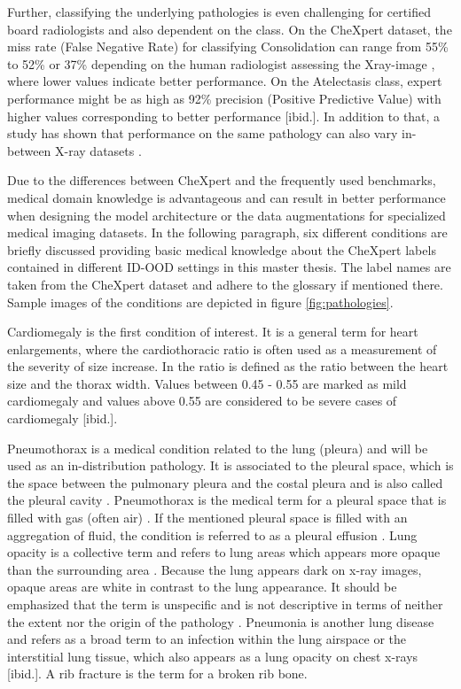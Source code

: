 Further, classifying the underlying pathologies is even challenging for certified board radiologists and also dependent on the class.
On the CheXpert dataset, the miss rate (False Negative Rate) for classifying Consolidation can range from 55\% to 52\% or 37\% depending on the human radiologist assessing the Xray-image \citep{Irvin2019}, where lower values indicate better performance.
On the Atelectasis class, expert performance might be as high as 92\% precision (Positive Predictive Value) with higher values corresponding to better performance [ibid.].
In addition to that, a study has shown that performance on the same pathology can also vary in-between X-ray datasets \textcolor{red}{\citep{Majkowska2020}}.
\par
Due to the differences between CheXpert and the frequently used benchmarks, medical domain knowledge is advantageous and can result in better performance when designing the model architecture or the data augmentations for specialized medical imaging datasets.
In the following paragraph, six different conditions are briefly discussed providing basic medical knowledge about the CheXpert labels contained in different ID-OOD settings in this master thesis.
The label names are taken from the CheXpert dataset \citep{Irvin2019} and adhere to the glossary \citep{Hansell2008} if mentioned there.
Sample images of the conditions are depicted in figure \ref{fig:pathologies}.
\par
Cardiomegaly is the first condition of interest.
It is a general term for heart enlargements, where the cardiothoracic ratio is often used as a measurement of the severity of size increase.
In \citep{Dahnert2011} the ratio is defined as the ratio between the heart size and the thorax width. 
Values between 0.45 - 0.55 are marked as mild cardiomegaly and values above 0.55 are considered to be severe cases of cardiomegaly [ibid.].
\par 
Pneumothorax is a medical condition related to the lung (pleura) and will be used as an in-distribution pathology.
It is associated to the pleural space, which is the space between the pulmonary pleura and the costal pleura and is also called the pleural cavity \citep{Charalampidis2015}.
Pneumothorax is the medical term for a pleural space that is filled with gas (often air) \citep{Dahnert2011,Hansell2008}.
If the mentioned pleural space is filled with an aggregation of fluid, the condition is referred to as a pleural effusion \citep{Karkhanis2012}.
Lung opacity is a collective term and refers to lung areas which appears more opaque than the surrounding area \citep{Hansell2008}.
Because the lung appears dark on x-ray images, opaque areas are white in contrast to the lung appearance.
It should be emphasized that the term is unspecific and is not descriptive in terms of neither the extent nor the origin of the pathology \citep{Hansell2008}.
Pneumonia is another lung disease and refers as a broad term to an infection within the lung airspace or the interstitial lung tissue, which also appears as a lung opacity on chest x-rays [ibid.].
A rib fracture is the term for a broken rib bone.
